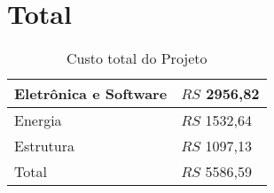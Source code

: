 \section{Total}

\begin{table}[h!]
\centering
\begin{tabular}{| m{8cm}|m{4cm}|}
\hline
Eletrônica e Software &  $RS$ 2956,82  \\\hline
Energia &  $RS$ 1532,64 \\ \hline
Estrutura &  $RS$ 1097,13 \\ \hline
Total  & $RS$ 5586,59 \\\hline
\end{tabular}
\caption{Custo total do Projeto }
\label{tab:custos_estrutura}
\end{table}
